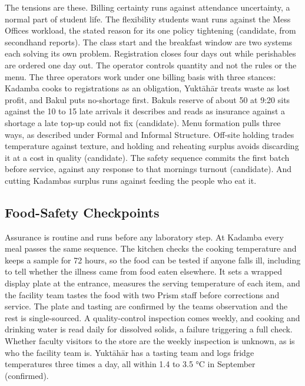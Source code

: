 \documentclass[
  10pt,
  table]{article}
\begin{document}
The tensions are these. Billing certainty runs against attendance uncertainty, a normal part of student life. The flexibility students want runs against the Mess Office\textquotesingle s workload, the stated reason for its one policy tightening (candidate, from secondhand reports). The class start and the breakfast window are two systems each solving its own problem. Registration closes four days out while perishables are ordered one day out. The operator controls quantity and not the rules or the menu. The three operators work under one billing basis with three stances: Kadamba cooks to registrations as an obligation, Yuktāhār treats waste as lost profit, and Bakul puts no-shortage first. Bakul\textquotesingle s reserve of about 50 at 9:20 sits against the 10 to 15 late arrivals it describes and reads as insurance against a shortage a late top-up could not fix (candidate). Menu formation pulls three ways, as described under Formal and Informal Structure. Off-site holding trades temperature against texture, and holding and reheating surplus avoids discarding it at a cost in quality (candidate). The safety sequence commits the first batch before service, against any response to that morning\textquotesingle s turnout (candidate). And cutting Kadamba\textquotesingle s surplus runs against feeding the people who eat it.

\subsection{Food-Safety Checkpoints}\label{food-safety-checkpoints}

Assurance is routine and runs before any laboratory step. At Kadamba every meal passes the same sequence. The kitchen checks the cooking temperature and keeps a sample for 72 hours, so the food can be tested if anyone falls ill, including to tell whether the illness came from food eaten elsewhere. It sets a wrapped display plate at the entrance, measures the serving temperature of each item, and the facility team tastes the food with two Prism staff before corrections and service. The plate and tasting are confirmed by the team\textquotesingle s observation and the rest is single-sourced. A quality-control inspection comes weekly, and cooking and drinking water is read daily for dissolved solids, a failure triggering a full check. Whether faculty visitors to the store are the weekly inspection is unknown, as is who the facility team is. Yuktāhār has a tasting team and logs fridge temperatures three times a day, all within 1.4 to 3.5 °C in September (confirmed).
\end{document}

